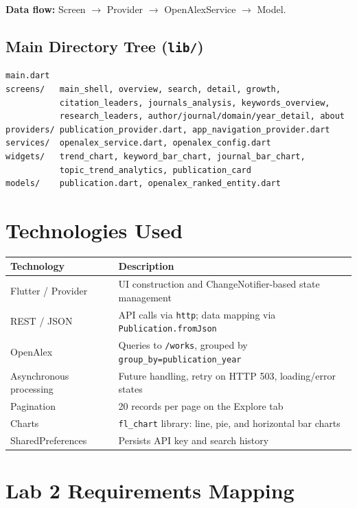 \documentclass[11pt,a4paper]{article}
\begin{document}
\textbf{Data flow:} Screen $\rightarrow$ Provider $\rightarrow$ OpenAlexService $\rightarrow$ Model.

\subsection{Main Directory Tree (\texttt{lib/})}
\begin{lstlisting}
main.dart
screens/   main_shell, overview, search, detail, growth,
           citation_leaders, journals_analysis, keywords_overview,
           research_leaders, author/journal/domain/year_detail, about
providers/ publication_provider.dart, app_navigation_provider.dart
services/  openalex_service.dart, openalex_config.dart
widgets/   trend_chart, keyword_bar_chart, journal_bar_chart,
           topic_trend_analytics, publication_card
models/    publication.dart, openalex_ranked_entity.dart
\end{lstlisting}

\section{Technologies Used}

\begin{tabular}{@{}p{3.2cm}p{10.8cm}@{}}
\toprule
\textbf{Technology} & \textbf{Description} \\
\midrule
Flutter / Provider & UI construction and ChangeNotifier-based state management \\
REST / JSON & API calls via \texttt{http}; data mapping via \texttt{Publication.fromJson} \\
OpenAlex & Queries to \texttt{/works}, grouped by \texttt{group\_by=publication\_year} \\
Asynchronous processing & Future handling, retry on HTTP 503, loading/error states \\
Pagination & 20 records per page on the Explore tab \\
Charts & \texttt{fl\_chart} library: line, pie, and horizontal bar charts \\
SharedPreferences & Persists API key and search history \\
\bottomrule
\end{tabular}

\section{Lab 2 Requirements Mapping}
\end{document}
